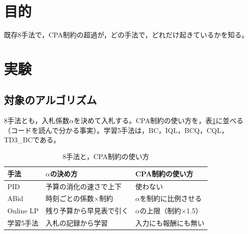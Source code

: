 \documentclass[twocolumn, 11pt]{ujarticle}
\begin{document}
\beginverification

\section{目的}\label{sec:e-purpose}

既存8手法で，CPA制約の超過が，どの手法で，どれだけ起きているかを知る。

\section{実験}\label{sec:e-exp}

\subsection{対象のアルゴリズム}\label{sec:e-algo}

8手法とも，入札係数$\alpha$を決めて入札する。CPA制約の使い方を，表\ref{tab:algo}に並べる（コードを読んで分かる事実）。学習5手法は，BC，IQL，BCQ，CQL，TD3\_BCである。

\begin{table}[H]
\centering
\caption{8手法と，CPA制約の使い方}
\label{tab:algo}
\small
\begin{tabularx}{\linewidth}{@{}p{1.95cm}>{\raggedright\arraybackslash}X>{\raggedright\arraybackslash}X@{}}
\toprule
手法 & $\alpha$の決め方 & CPA制約の使い方 \\
\midrule
PID & 予算の消化の速さで上下 & 使わない \\
ABid & 時刻ごとの係数×制約 & $\alpha$を制約に比例させる \\
Online LP & 残り予算から早見表で引く & $\alpha$の上限（制約×1.5） \\
学習5手法 & 入札の記録から学習 & 入力にも報酬にも無い \\
\bottomrule
\end{tabularx}
\end{table}
\end{document}
